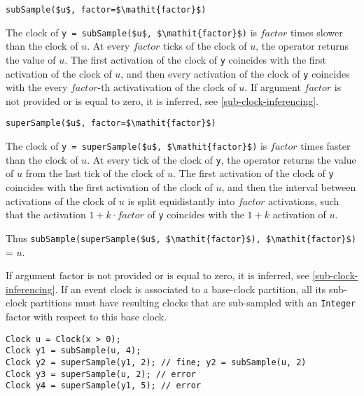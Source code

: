 \begin{operatordefinition}[subSample]
\begin{synopsis}\begin{lstlisting}
subSample($u$, factor=$\mathit{factor}$)
\end{lstlisting}\end{synopsis}
\begin{semantics}
The clock of \lstinline!y = subSample($u$, $\mathit{factor}$)! is $\mathit{factor}$ times slower than the clock of $u$.  At every $\mathit{factor}$ ticks of the clock of $u$, the operator returns the value of $u$.  The first activation of the clock of \lstinline!y! coincides with the first activation of the clock of $u$, and then every activation of the clock of \lstinline!y! coincides with the every $\mathit{factor}$-th activativation of the clock of $u$.  If argument $\mathit{factor}$ is not provided or is equal to zero, it is inferred, see \cref{sub-clock-inferencing}.
\end{semantics}
\end{operatordefinition}

\begin{operatordefinition}[superSample]
\begin{synopsis}\begin{lstlisting}
superSample($u$, factor=$\mathit{factor}$)
\end{lstlisting}\end{synopsis}
\begin{semantics}
The clock of \lstinline!y = superSample($u$, $\mathit{factor}$)! is $\mathit{factor}$ times faster than the clock of $u$.  At every tick of the clock of \lstinline!y!, the operator returns the value of $u$ from the last tick of the clock of $u$.  The first activation of the clock of \lstinline!y! coincides with the first activation of the clock of $u$, and then the interval between activations of the clock of $u$ is split equidistantly into $\mathit{factor}$ activations, such that the activation $1 + k \cdot \mathit{factor}$ of \lstinline!y! coincides with the $1 + k$ activation of $u$.
\begin{nonnormative}
Thus \lstinline!subSample(superSample($u$, $\mathit{factor}$), $\mathit{factor}$)! = $u$.
\end{nonnormative}
If argument factor is not provided or is equal to zero, it is inferred, see \cref{sub-clock-inferencing}.  If an event clock is associated to a base-clock partition, all its sub-clock partitions must have resulting clocks that are sub-sampled with an \lstinline!Integer! factor with respect to this base clock.

\begin{example}
\begin{lstlisting}[language=modelica]
Clock u = Clock(x > 0);
Clock y1 = subSample(u, 4);
Clock y2 = superSample(y1, 2); // fine; y2 = subSample(u, 2)
Clock y3 = superSample(u, 2); // error
Clock y4 = superSample(y1, 5); // error
\end{lstlisting}
\end{example}
\end{semantics}
\end{operatordefinition}

